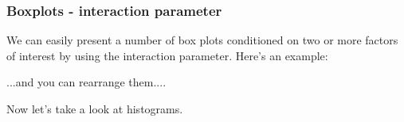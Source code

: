 \documentclass[titlepage]{book}\usepackage{knitr}
\begin{document}
\begin{knitrout}
\color{fgcolor}\begin{kframe}
\begin{alltt}
 \hlkwb{<-} \hlstd{()} \hlopt{+}
  \hlstd{(}  \hlstd{(}      
\end{alltt}
\end{kframe}
\end{knitrout}

\subsubsection{Boxplots - interaction parameter}  
We can easily present a number of box plots conditioned on two or more factors of interest by using the interaction parameter. Here's an example:
\begin{knitrout}
\color{fgcolor}\begin{kframe}
\begin{alltt}
 \hlkwb{<-} \hlstd{(}  \hlstd{(} \hlstd{=}  
 \hlkwb{<-}  \hlopt{+} \hlstd{(} \hlstd{=} \hlstd{)}
\end{alltt}
\end{kframe}
\end{knitrout}
...and you can rearrange them....

\begin{knitrout}
\color{fgcolor}\begin{kframe}
\begin{alltt}
 \hlkwb{<-} \hlstd{(}  \hlstd{(} \hlstd{=}  
 \hlkwb{<-}  \hlopt{+} \hlstd{(} \hlstd{=} \hlstd{)}
\end{alltt}
\end{kframe}
\end{knitrout}
Now let's take a look at histograms.
\end{document}
